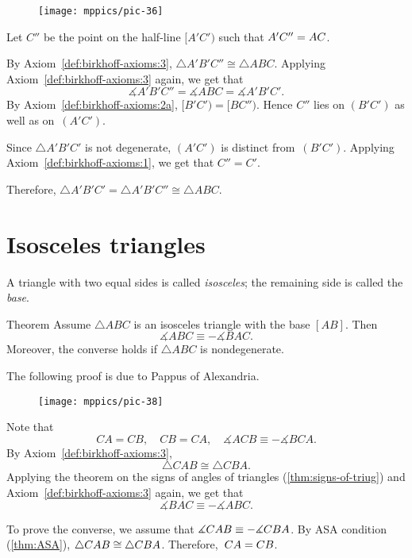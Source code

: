 \begin{wrapfigure}{o}{26mm}
\vskip-2mm
\centering
\texttt{[image: mppics/pic-36]}
\end{wrapfigure}

Let $C''$ be the point on the half-line $[A' C')$ such that $A' C''\z=A C$. 

By Axiom~\ref{def:birkhoff-axioms:3}, 
$\triangle A' B' C''\cong \triangle A B C$. 
Applying Axiom~\ref{def:birkhoff-axioms:3} again,
we get that
$$\measuredangle A' B' C'' = \measuredangle A B C=\measuredangle A' B' C'.$$
By Axiom~\ref{def:birkhoff-axioms:2a}, $[B'C')=[B C'')$. 
Hence
$C''$ lies on $(B' C')$ as well as on~$(A' C')$.

Since $\triangle A' B' C'$ is not degenerate, $(A' C')$ is distinct from~$(B' C')$.
Applying Axiom~\ref{def:birkhoff-axioms:1}, we get that $C''=C'$. 

Therefore, 
$\triangle A' B' C'=\triangle A' B' C''\cong\triangle A B C$.
\qeds

\section{Isosceles triangles}

A triangle with two equal sides is called \emph{isosceles};
the remaining side is called the \emph{base}.


\begin{thm}[\abs]{Theorem}\label{thm:isos}
Assume $\triangle A B C$ is an isosceles triangle with the base $[A B]$. 
Then 
$$\measuredangle A B C\equiv -\measuredangle B A C.$$
Moreover, the converse holds if $\triangle A B C$ is nondegenerate.
\end{thm}

The following proof is due to Pappus of Alexandria.

\begin{wrapfigure}[10]{o}{25mm}
\vskip-4mm
\centering
\texttt{[image: mppics/pic-38]}
\end{wrapfigure}

Note that
$$C A = C B,
\quad 
C B=C A,
\quad
\measuredangle A C B \equiv -\measuredangle B C A.$$
By Axiom~\ref{def:birkhoff-axioms:3},
$$\triangle C A B\cong\triangle C B A.$$
Applying the theorem on the signs of angles of triangles (\ref{thm:signs-of-triug}) and Axiom~\ref{def:birkhoff-axioms:3} again,
we get that 
$$\measuredangle B A C
\equiv -\measuredangle A B C.$$

To prove the converse, we assume that
$\measuredangle C A B \z\equiv - \measuredangle C B A$.
By ASA condition (\ref{thm:ASA}), $\triangle C A B\z\cong\triangle CBA$.
Therefore,~$C A\z=C B$.
\qeds

